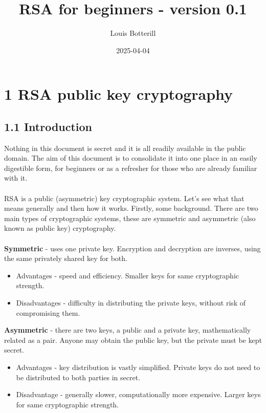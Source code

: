 \documentclass[11pt]{article}   	%
\title{RSA for beginners - version 0.1}
\author{Louis Botterill}
\date{2025-04-04}					%
\begin{document}
\maketitle

\pagebreak

\section*{1 RSA public key cryptography}

\subsection*{1.1 Introduction}

Nothing in this document is secret and it is all readily available in the public domain. The aim of this document is to consolidate it into one place in an easily digestible form, for beginners or as a refresher for those who are already familiar with it. \\
\\
RSA is a public (asymmetric) key cryptographic system. Let's see what that means generally and then how it works.
Firstly, some background. There are two main types of cryptographic systems, these are symmetric and asymmetric (also known as public key) cryptography. \\
\\
\textbf{Symmetric} - uses one private key. Encryption and decryption are inverses, using the same privately shared key for both.
\begin{itemize}
 \item Advantages - speed and efficiency. Smaller keys for same cryptographic strength.
 \item Disadvantages - difficulty in distributing the private keys, without risk of compromising them.
\end{itemize}

\textbf{Asymmetric} - there are two keys, a public and a private key, mathematically related as a pair. Anyone may obtain the public key, but the private must be kept secret.
\begin{itemize}
 \item Advantages - key distribution is vastly simplified. Private keys do not need to be distributed to both parties in secret.
 \item Disadvantage - generally slower, computationally more expensive. Larger keys for same cryptographic strength.
\end{itemize}
\end{document}
